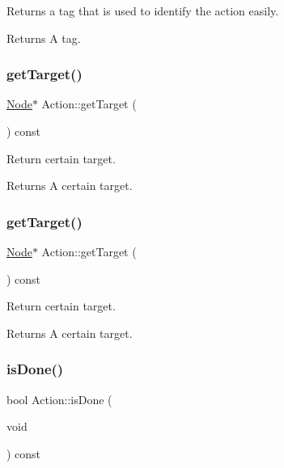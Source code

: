 Returns a tag that is used to identify the action easily.

\begin{DoxyReturn}{Returns}
A tag. 
\end{DoxyReturn}
\mbox{\label{classAction_a696d1ef82807cc18207ba93d59d6ca16}} 
\subsubsection{\texorpdfstring{get\+Target()}{getTarget()}\hspace{0.1cm}{\footnotesize\ttfamily [1/2]}}
{\footnotesize\ttfamily \hyperlink{classNode}{Node}$\ast$ Action\+::get\+Target (\begin{DoxyParamCaption}{ }\end{DoxyParamCaption}) const\hspace{0.3cm}{\ttfamily [inline]}}

Return certain target.

\begin{DoxyReturn}{Returns}
A certain target. 
\end{DoxyReturn}
\mbox{\label{classAction_a696d1ef82807cc18207ba93d59d6ca16}} 
\subsubsection{\texorpdfstring{get\+Target()}{getTarget()}\hspace{0.1cm}{\footnotesize\ttfamily [2/2]}}
{\footnotesize\ttfamily \hyperlink{classNode}{Node}$\ast$ Action\+::get\+Target (\begin{DoxyParamCaption}{ }\end{DoxyParamCaption}) const\hspace{0.3cm}{\ttfamily [inline]}}

Return certain target.

\begin{DoxyReturn}{Returns}
A certain target. 
\end{DoxyReturn}
\mbox{\label{classAction_a9b5dd627540a85f89f3e82acd46b7772}} 
\subsubsection{\texorpdfstring{is\+Done()}{isDone()}\hspace{0.1cm}{\footnotesize\ttfamily [1/2]}}
{\footnotesize\ttfamily bool Action\+::is\+Done (\begin{DoxyParamCaption}\item[{void}]{ }\end{DoxyParamCaption}) const\hspace{0.3cm}{\ttfamily [virtual]}}

